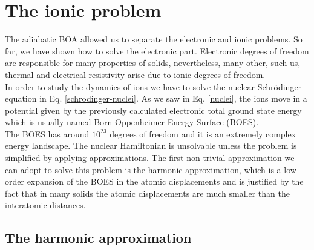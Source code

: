 
\chapter{The ionic problem} %

\label{Chapter3} %


The adiabatic BOA allowed us to separate the electronic and ionic problems. So far, we have shown how to solve the electronic part. Electronic degrees of freedom are responsible for many properties 
of solids, nevertheless, many other, such us, thermal and electrical resistivity arise due to ionic degrees of freedom. \\

In order to study the dynamics of ions we have to solve the nuclear Schr\"odinger equation in Eq. 
\ref{schrodinger-nuclei}. As we saw in Eq. \ref{nuclei}, the ions move in a potential given by the previously 
calculated electronic total ground state energy which is usually named Born-Oppenheimer Energy Surface (BOES). \\

The BOES has around $10^{23}$ degrees of freedom and it is an extremely complex energy landscape. The nuclear Hamiltonian is unsolvable unless the problem is simplified by applying approximations. The first non-trivial 
approximation we can adopt to solve this problem is the harmonic approximation, which is a low-order expansion of the BOES in the atomic displacements and is justified by the fact that in many solids the atomic displacements are 
much smaller than the interatomic distances\cite{ashcroft1976solid}.

\section{The harmonic approximation}
\label{harmonic-approximation}

